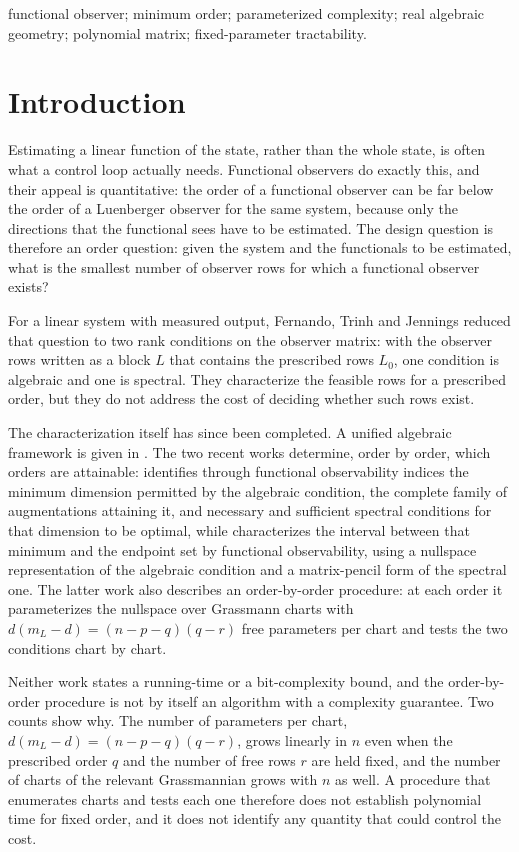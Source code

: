 \documentclass[journal]{IEEEtran}
\theoremstyle{plainn}
\theoremstyle{remark}
\begin{document}
\begin{IEEEkeywords}
functional observer; minimum order; parameterized complexity; real algebraic geometry; polynomial matrix; fixed-parameter tractability.
\end{IEEEkeywords}

\section{Introduction}\label{sec:intro}

Estimating a linear function of the state, rather than the whole state, is often what a
control loop actually needs. Functional observers do exactly this, and their appeal is
quantitative: the order of a functional observer can be far below the order of a
Luenberger observer for the same system, because only the directions that the functional
sees have to be estimated. The design question is therefore an order question: given the
system and the functionals to be estimated, what is the smallest number of observer rows
for which a functional observer exists?

For a linear system with measured output, Fernando, Trinh and Jennings \cite{fer10}
reduced that question to two rank conditions on the observer matrix: with the observer
rows written as a block $L$ that contains the prescribed rows $L_0$, one condition
is algebraic and one is spectral. They characterize the feasible rows for a prescribed
order, but they do not address the cost of deciding whether such rows exist.

The characterization itself has since been completed. A unified algebraic framework is
given in \cite{dar25}. The two recent works \cite{fer26a,fer26b} determine, order by
order, which orders are attainable: \cite{fer26a} identifies through functional
observability indices the minimum dimension permitted by the algebraic condition, the
complete family of augmentations attaining it, and necessary and sufficient spectral
conditions for that dimension to be optimal, while \cite{fer26b} characterizes the
interval between that minimum and the endpoint set by functional observability, using a
nullspace representation of the algebraic condition and a matrix-pencil form of the
spectral one. The latter work also describes an order-by-order procedure: at each order
it parameterizes the nullspace over Grassmann charts with $d(m_L-d)=(n-p-q)(q-r)$ free
parameters per chart and tests the two conditions chart by chart.

Neither work states a running-time or a bit-complexity bound, and the order-by-order
procedure is not by itself an algorithm with a complexity guarantee. Two counts show why. The
number of parameters per chart, $d(m_L-d)=(n-p-q)(q-r)$, grows linearly in $n$ even when the
prescribed order $q$ and the number of free rows $r$ are held fixed, and the number of charts
of the relevant Grassmannian grows with $n$ as well. A procedure that enumerates charts and
tests each one therefore does not establish polynomial time for fixed order, and it does not
identify any quantity that could control the cost.
\end{document}
